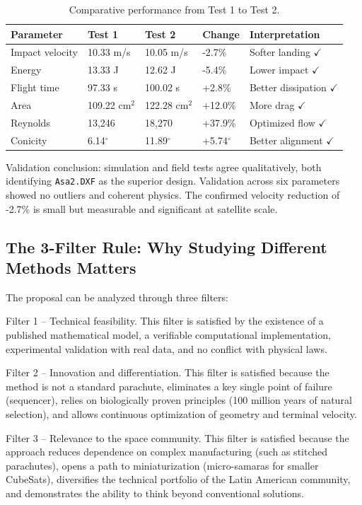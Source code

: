 \documentclass[12pt,a4paper]{article}
\begin{document}
\begin{longtable}{@{}p{2.6cm}p{2.1cm}p{2.1cm}p{2.1cm}p{5.1cm}@{}}
\caption{Comparative performance from Test 1 to Test 2.}\label{tab:test1-test2-comparison}\\
\toprule
Parameter & Test 1 & Test 2 & Change & Interpretation \\
\midrule
Impact velocity & 10.33 m/s & 10.05 m/s & -2.7\% & Softer landing $\checkmark$ \\
Energy & 13.33 J & 12.62 J & -5.4\% & Lower impact $\checkmark$ \\
Flight time & 97.33 s & 100.02 s & +2.8\% & Better dissipation $\checkmark$ \\
Area & 109.22 cm$^2$ & 122.28 cm$^2$ & +12.0\% & More drag $\checkmark$ \\
Reynolds & 13,246 & 18,270 & +37.9\% & Optimized flow $\checkmark$ \\
Conicity & 6.14$^\circ$ & 11.89$^\circ$ & +5.74$^\circ$ & Better alignment $\checkmark$ \\
\bottomrule
\end{longtable}

Validation conclusion: simulation and field tests agree qualitatively, both identifying \texttt{Asa2.DXF} as the superior design. Validation across six parameters showed no outliers and coherent physics. The confirmed velocity reduction of -2.7\% is small but measurable and significant at satellite scale.

\subsection{The 3-Filter Rule: Why Studying Different Methods Matters}

The proposal can be analyzed through three filters:

Filter 1 -- Technical feasibility.
This filter is satisfied by the existence of a published mathematical model, a verifiable computational implementation, experimental validation with real data, and no conflict with physical laws.

Filter 2 -- Innovation and differentiation.
This filter is satisfied because the method is not a standard parachute, eliminates a key single point of failure (sequencer), relies on biologically proven principles (100 million years of natural selection), and allows continuous optimization of geometry and terminal velocity.

Filter 3 -- Relevance to the space community.
This filter is satisfied because the approach reduces dependence on complex manufacturing (such as stitched parachutes), opens a path to miniaturization (micro-samaras for smaller CubeSats), diversifies the technical portfolio of the Latin American community, and demonstrates the ability to think beyond conventional solutions.
\end{document}
